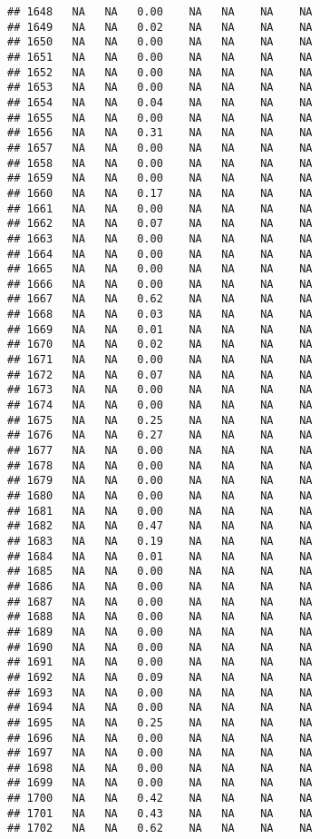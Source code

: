 \documentclass{article}\usepackage{graphicx, color}
\makeatletter
\newenvironment{kframe}{%
 \def\at@end@of@kframe{}%
 \ifinner\ifhmode%
  \def\at@end@of@kframe{\end{minipage}}%
  \begin{minipage}{\columnwidth}%
 \fi\fi%
 \def\FrameCommand##1{\hskip\@totalleftmargin \hskip-\fboxsep
 \colorbox{shadecolor}{##1}\hskip-\fboxsep
     \hskip-\linewidth \hskip-\@totalleftmargin \hskip\columnwidth}%
 \MakeFramed {\advance\hsize-\width
   \@totalleftmargin\z@ \linewidth\hsize
   \@setminipage}}%
 {\par\unskip\endMakeFramed%
 \at@end@of@kframe}
\newenvironment{knitrout}{}{} %
\makeatother
\begin{document}
\begin{knitrout}
\begin{kframe}
\begin{verbatim}
## 1648   NA   NA   0.00    NA   NA    NA    NA
## 1649   NA   NA   0.02    NA   NA    NA    NA
## 1650   NA   NA   0.00    NA   NA    NA    NA
## 1651   NA   NA   0.00    NA   NA    NA    NA
## 1652   NA   NA   0.00    NA   NA    NA    NA
## 1653   NA   NA   0.00    NA   NA    NA    NA
## 1654   NA   NA   0.04    NA   NA    NA    NA
## 1655   NA   NA   0.00    NA   NA    NA    NA
## 1656   NA   NA   0.31    NA   NA    NA    NA
## 1657   NA   NA   0.00    NA   NA    NA    NA
## 1658   NA   NA   0.00    NA   NA    NA    NA
## 1659   NA   NA   0.00    NA   NA    NA    NA
## 1660   NA   NA   0.17    NA   NA    NA    NA
## 1661   NA   NA   0.00    NA   NA    NA    NA
## 1662   NA   NA   0.07    NA   NA    NA    NA
## 1663   NA   NA   0.00    NA   NA    NA    NA
## 1664   NA   NA   0.00    NA   NA    NA    NA
## 1665   NA   NA   0.00    NA   NA    NA    NA
## 1666   NA   NA   0.00    NA   NA    NA    NA
## 1667   NA   NA   0.62    NA   NA    NA    NA
## 1668   NA   NA   0.03    NA   NA    NA    NA
## 1669   NA   NA   0.01    NA   NA    NA    NA
## 1670   NA   NA   0.02    NA   NA    NA    NA
## 1671   NA   NA   0.00    NA   NA    NA    NA
## 1672   NA   NA   0.07    NA   NA    NA    NA
## 1673   NA   NA   0.00    NA   NA    NA    NA
## 1674   NA   NA   0.00    NA   NA    NA    NA
## 1675   NA   NA   0.25    NA   NA    NA    NA
## 1676   NA   NA   0.27    NA   NA    NA    NA
## 1677   NA   NA   0.00    NA   NA    NA    NA
## 1678   NA   NA   0.00    NA   NA    NA    NA
## 1679   NA   NA   0.00    NA   NA    NA    NA
## 1680   NA   NA   0.00    NA   NA    NA    NA
## 1681   NA   NA   0.00    NA   NA    NA    NA
## 1682   NA   NA   0.47    NA   NA    NA    NA
## 1683   NA   NA   0.19    NA   NA    NA    NA
## 1684   NA   NA   0.01    NA   NA    NA    NA
## 1685   NA   NA   0.00    NA   NA    NA    NA
## 1686   NA   NA   0.00    NA   NA    NA    NA
## 1687   NA   NA   0.00    NA   NA    NA    NA
## 1688   NA   NA   0.00    NA   NA    NA    NA
## 1689   NA   NA   0.00    NA   NA    NA    NA
## 1690   NA   NA   0.00    NA   NA    NA    NA
## 1691   NA   NA   0.00    NA   NA    NA    NA
## 1692   NA   NA   0.09    NA   NA    NA    NA
## 1693   NA   NA   0.00    NA   NA    NA    NA
## 1694   NA   NA   0.00    NA   NA    NA    NA
## 1695   NA   NA   0.25    NA   NA    NA    NA
## 1696   NA   NA   0.00    NA   NA    NA    NA
## 1697   NA   NA   0.00    NA   NA    NA    NA
## 1698   NA   NA   0.00    NA   NA    NA    NA
## 1699   NA   NA   0.00    NA   NA    NA    NA
## 1700   NA   NA   0.42    NA   NA    NA    NA
## 1701   NA   NA   0.43    NA   NA    NA    NA
## 1702   NA   NA   0.62    NA   NA    NA    NA

\end{verbatim}
\end{kframe}
\end{knitrout}
\end{document}
